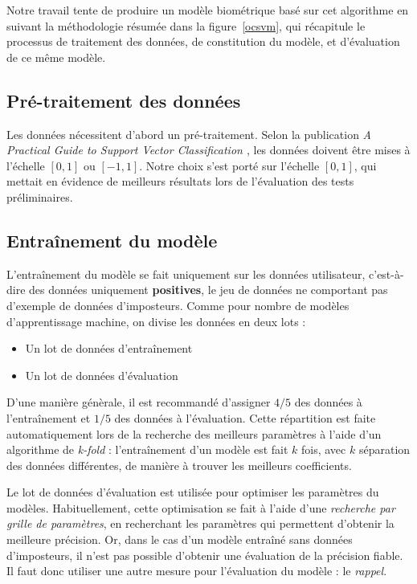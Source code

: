 Notre travail tente de produire un modèle biométrique basé sur cet algorithme en suivant la méthodologie résumée dans la figure~\ref{ocsvm}, qui récapitule le processus de traitement des données, de constitution du modèle, et d'évaluation de ce même modèle.

\subsection{Pré-traitement des données}

Les données nécessitent d'abord un pré-traitement. Selon la publication \textit{A Practical Guide to Support Vector Classification \cite{svmpractical}}, les données doivent être mises à l'échelle $[0, 1]$ ou $[-1, 1]$. Notre choix s'est porté sur l'échelle $[0, 1]$, qui mettait en évidence de meilleurs résultats lors de l'évaluation des tests préliminaires.

\label{modele}
\subsection{Entraînement du modèle}

L'entraînement du modèle se fait uniquement sur les données utilisateur, c'est-à-dire des données uniquement \textbf{positives}, le jeu de données ne comportant pas d'exemple de données d'imposteurs. Comme pour nombre de modèles d'apprentissage machine, on divise les données en deux lots :

\begin{itemize}
    \item Un lot de données d'entraînement
    \item Un lot de données d'évaluation
\end{itemize}

D'une manière génèrale, il est recommandé d'assigner $4/5$ des données à l'entraînement et $1/5$ des données à l'évaluation. Cette répartition est faite automatiquement lors de la recherche des meilleurs paramètres à l'aide d'un algorithme de \textit{k-fold} : l'entraînement d'un modèle est fait $k$ fois, avec $k$ séparation des données différentes, de manière à trouver les meilleurs coefficients.

Le lot de données d'évaluation est utilisée pour optimiser les paramètres du modèles. Habituellement, cette optimisation se fait à l'aide d'une \textit{recherche par grille de paramètres}, en recherchant les paramètres qui permettent d'obtenir la meilleure précision. Or, dans le cas d'un modèle entraîné sans données d'imposteurs, il n'est pas possible d'obtenir une évaluation de la précision fiable. Il faut donc utiliser une autre mesure pour l'évaluation du modèle : le \textit{rappel}.

